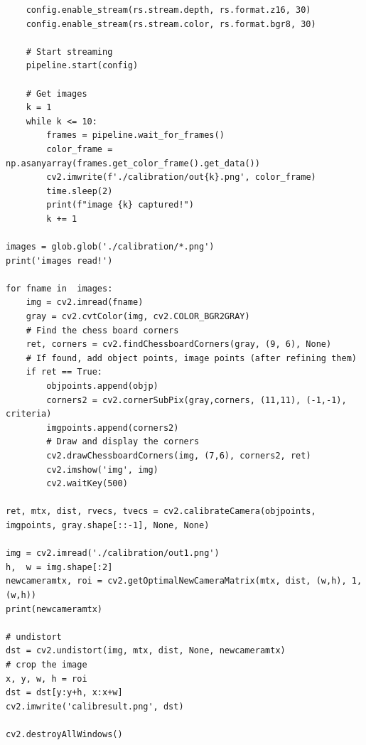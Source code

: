 \begin{verbatim}
    config.enable_stream(rs.stream.depth, rs.format.z16, 30)
    config.enable_stream(rs.stream.color, rs.format.bgr8, 30)

    # Start streaming
    pipeline.start(config)
    
    # Get images
    k = 1
    while k <= 10:
        frames = pipeline.wait_for_frames()
        color_frame = np.asanyarray(frames.get_color_frame().get_data())
        cv2.imwrite(f'./calibration/out{k}.png', color_frame)
        time.sleep(2)
        print(f"image {k} captured!")
        k += 1

images = glob.glob('./calibration/*.png')
print('images read!')

for fname in  images:
    img = cv2.imread(fname)
    gray = cv2.cvtColor(img, cv2.COLOR_BGR2GRAY)
    # Find the chess board corners
    ret, corners = cv2.findChessboardCorners(gray, (9, 6), None)
    # If found, add object points, image points (after refining them)
    if ret == True:
        objpoints.append(objp)
        corners2 = cv2.cornerSubPix(gray,corners, (11,11), (-1,-1), criteria)
        imgpoints.append(corners2)
        # Draw and display the corners
        cv2.drawChessboardCorners(img, (7,6), corners2, ret)
        cv2.imshow('img', img)
        cv2.waitKey(500)

ret, mtx, dist, rvecs, tvecs = cv2.calibrateCamera(objpoints, imgpoints, gray.shape[::-1], None, None)

img = cv2.imread('./calibration/out1.png')
h,  w = img.shape[:2]
newcameramtx, roi = cv2.getOptimalNewCameraMatrix(mtx, dist, (w,h), 1, (w,h))
print(newcameramtx)

# undistort
dst = cv2.undistort(img, mtx, dist, None, newcameramtx)
# crop the image
x, y, w, h = roi
dst = dst[y:y+h, x:x+w]
cv2.imwrite('calibresult.png', dst)

cv2.destroyAllWindows()
\end{verbatim}
